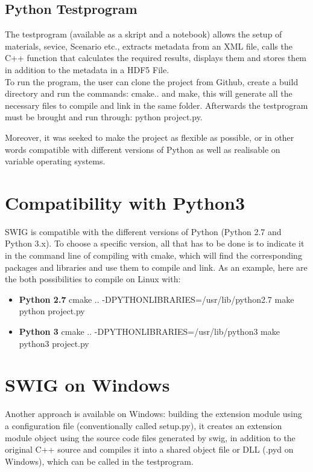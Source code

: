 \subsection{Python Testprogram}
The testprogram (available as a skript and a notebook) allows the setup of materials, sevice, Scenario etc., extracts metadata from an XML file, calls the C++ function that calculates the required results, displays them and  stores them in addition to the metadata in a HDF5 File.\\

To run the program, the user can clone the project from Github, create a build directory and run the commands: cmake.. and make, this will generate all the necessary files to compile and link in the same folder. Afterwards the testprogram must be brought and run through: python project.py. 

Moreover, it was seeked to make the project as flexible as possible, or in other words compatible with different versions of Python as well as realisable on variable operating systems.
\section{Compatibility with Python3}
SWIG is compatible with the different versions of Python (Python 2.7 and Python 3.x). To choose a specific version, all that has to be done is to indicate it in the command line of compiling with cmake, which will find the corresponding packages and libraries and use them to compile and link. As an example, here are the both possibilities to compile on Linux with:
\begin{itemize}
\item \textbf{Python 2.7} 
cmake .. -DPYTHON\textunderscore LIBRARIES=/usr/lib/python2.7
make
python project.py
\item \textbf{Python 3} 
cmake .. -DPYTHON\textunderscore LIBRARIES=/usr/lib/python3
make
python3 project.py
\end{itemize}

\section{SWIG on Windows}
Another approach is available on Windows: building the extension module using a configuration file (conventionally called setup.py), it creates an extension module object using the source code files generated by swig, in addition to the original C++ source and compiles it into a shared object file or DLL (.pyd on Windows), which can be called in the testprogram. 


